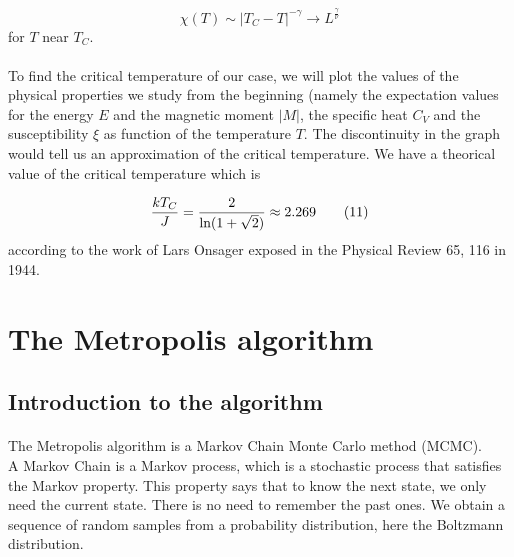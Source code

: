 \documentclass[a4paper, twoside, 11pt]{report}
\theoremstyle{theorem}
\theoremstyle{remark}
\theoremstyle{exemple}
\begin{document}
                \begin{equation*}
                    \chi(T) \sim |T_C - T|^{-\gamma} \rightarrow L^{\frac{\gamma}{\nu}}
                \end{equation*}
            for $T$ near $T_C$.
            
            \paragraph{}To find the critical temperature of our case, we will plot the values of the physical properties we study from the beginning (namely the expectation values for the energy $E$ and the magnetic moment $|M|$, the specific heat $C_V$ and the susceptibility $\xi$ as function of the temperature $T$. The discontinuity in the graph would tell us an approximation of the critical temperature. We have a theorical value of the critical temperature which is 
                
                \begin{equation*}
                    \frac{kT_C}{J} = \frac{2}{\textnormal{ln}(1+\sqrt{2})} \approx 2.269
                    \tag{11}
                \end{equation*}
            according to the work of Lars Onsager exposed in the Physical Review 65, 116 in 1944.
    
    
    \section{The Metropolis algorithm}
        
        \subsection{Introduction to the algorithm}
        
            \paragraph{}The Metropolis algorithm is a Markov Chain Monte Carlo method (MCMC).\\
            A Markov Chain is a Markov process, which is a stochastic process that satisfies the Markov property. This property says that to know the next state, we only need the current state. There is no need to remember the past ones. We obtain a sequence of random samples from a probability distribution, here the Boltzmann distribution.
            
\end{document}
